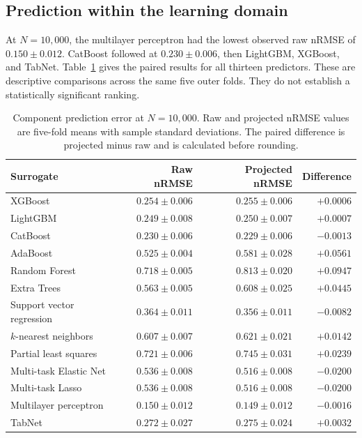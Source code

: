 \subsection{Prediction within the learning domain}

At $N=10{,}000$, the multilayer perceptron had the lowest observed raw nRMSE of $0.150\pm0.012$. CatBoost followed at $0.230\pm0.006$, then LightGBM, XGBoost, and TabNet. Table~\ref{tab:projection_prediction_results} gives the paired results for all thirteen predictors. These are descriptive comparisons across the same five outer folds. They do not establish a statistically significant ranking.

\begin{table}[htbp]
\centering\small
\caption{Component prediction error at $N=10{,}000$. Raw and projected nRMSE values are five-fold means with sample standard deviations. The paired difference is projected minus raw and is calculated before rounding.}
\label{tab:projection_prediction_results}
\begin{tabular}{p{4.7cm}rrr}
\toprule
Surrogate & Raw nRMSE & Projected nRMSE & Difference\\
\midrule
XGBoost & $0.254\pm0.006$ & $0.255\pm0.006$ & $+0.0006$\\
LightGBM & $0.249\pm0.008$ & $0.250\pm0.007$ & $+0.0007$\\
CatBoost & $0.230\pm0.006$ & $0.229\pm0.006$ & $-0.0013$\\
AdaBoost & $0.525\pm0.004$ & $0.581\pm0.028$ & $+0.0561$\\
Random Forest & $0.718\pm0.005$ & $0.813\pm0.020$ & $+0.0947$\\
Extra Trees & $0.563\pm0.005$ & $0.608\pm0.025$ & $+0.0445$\\
Support vector regression & $0.364\pm0.011$ & $0.356\pm0.011$ & $-0.0082$\\
$k$-nearest neighbors & $0.607\pm0.007$ & $0.621\pm0.021$ & $+0.0142$\\
Partial least squares & $0.721\pm0.006$ & $0.745\pm0.031$ & $+0.0239$\\
Multi-task Elastic Net & $0.536\pm0.008$ & $0.516\pm0.008$ & $-0.0200$\\
Multi-task Lasso & $0.536\pm0.008$ & $0.516\pm0.008$ & $-0.0200$\\
Multilayer perceptron & $0.150\pm0.012$ & $0.149\pm0.012$ & $-0.0016$\\
TabNet & $0.272\pm0.027$ & $0.275\pm0.024$ & $+0.0032$\\
\bottomrule
\end{tabular}
\end{table}

